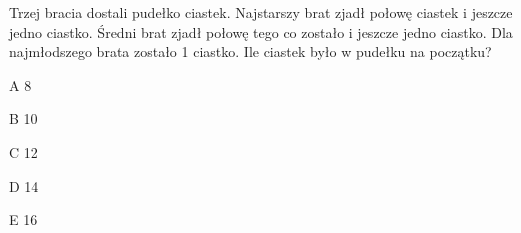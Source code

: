 \begin{tresc}
Trzej bracia dostali pudełko ciastek. Najstarszy brat zjadł połowę ciastek i jeszcze jedno ciastko. Średni brat zjadł połowę tego co zostało i jeszcze jedno ciastko. Dla najmłodszego brata zostało 1 ciastko. Ile ciastek było w pudełku na początku?
\end{tresc}
\begin{wariant}{A} 8 \end{wariant}
\begin{wariant}{B} 10 \end{wariant}
\begin{wariant}{C} 12 \end{wariant}
\begin{wariant}{D} 14 \end{wariant}
\begin{wariant}{E} 16 \end{wariant}
